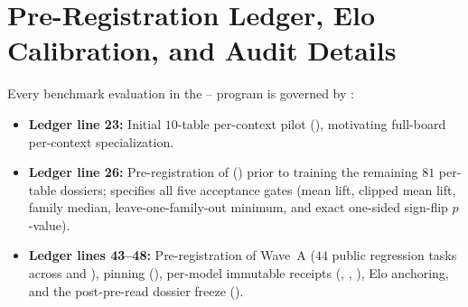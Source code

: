 \section{Pre-Registration Ledger, Elo Calibration, and Audit Details}
\label{app:protocol}

Every benchmark evaluation in the -- program is governed by :
\begin{itemize}
  \item \textbf{Ledger line 23:} Initial $10$-table per-context pilot (), motivating full-board per-context specialization.
  \item \textbf{Ledger line 26:} Pre-registration of  () prior to training the remaining $81$ per-table dossiers; specifies all five acceptance gates (mean lift, clipped mean lift, family median, leave-one-family-out minimum, and exact one-sided sign-flip $p$-value).
  \item \textbf{Ledger lines 43--48:} Pre-registration of Wave~A ($44$ public regression tasks across  and ), pinning  (), per-model immutable receipts (, , ),  Elo anchoring, and the  post-pre-read dossier freeze ().
\end{itemize}
